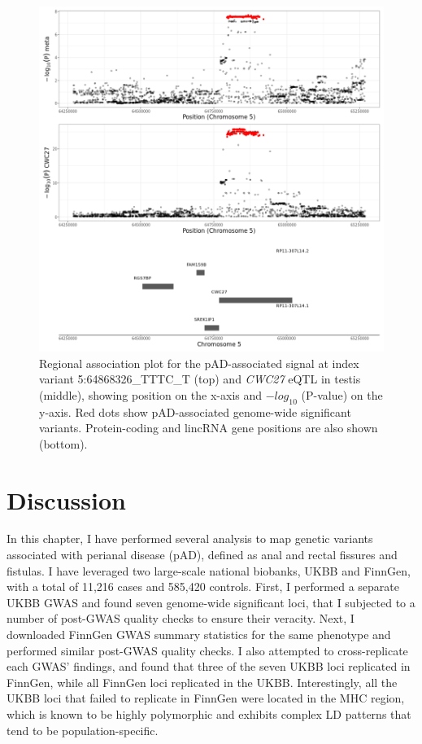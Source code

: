  \begin{figure}[H]
    \centering    
    \includegraphics[width=1.0\textwidth]{Vector/cwc27_testis.png}
    \caption[Figure]{Regional association plot for the pAD-associated signal at index variant 5:64868326\_TTTC\_T (top) and \textit{CWC27} eQTL in testis (middle), showing position on the x-axis and $-log_{10}$ (P-value) on the y-axis. Red dots show pAD-associated genome-wide significant variants. Protein-coding and lincRNA gene positions are also shown (bottom).}
    \label{fig:cwc27_testis}
    \end{figure}




\newpage
\section{Discussion}
In this chapter, I have performed several analysis to map genetic variants associated with perianal disease (pAD), defined as anal and rectal fissures and fistulas. I have leveraged two large-scale national biobanks, UKBB and FinnGen, with a total of 11,216 cases and 585,420 controls. First, I performed a separate UKBB GWAS and found seven genome-wide significant loci, that I subjected to a number of post-GWAS quality checks to ensure their veracity. Next, I downloaded FinnGen GWAS summary statistics for the same phenotype and performed similar post-GWAS quality checks. I also attempted to cross-replicate each GWAS' findings, and found that three of the seven UKBB loci replicated in FinnGen, while all FinnGen loci replicated in the UKBB. Interestingly, all the UKBB loci that failed to replicate in FinnGen were located in the MHC region, which is known to be highly polymorphic and exhibits complex LD patterns that tend to be population-specific. \\


